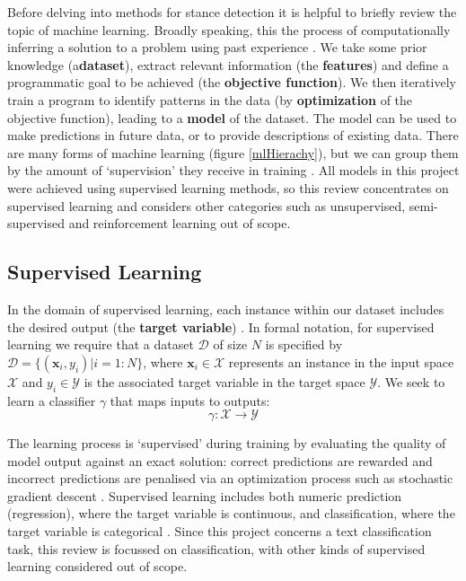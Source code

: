 \documentclass[Dissertation.tex]{subfiles}
\begin{document}
Before delving into methods for stance detection it is helpful to briefly review the topic of machine learning. Broadly speaking, this the process of computationally inferring a solution to a problem using past experience \cite{alpaydinIntroductionMachineLearning2014}. We take some prior knowledge (a\textbf{dataset}), extract relevant information (the \textbf{features}) and define a programmatic goal to be achieved (the \textbf{objective function}). We then iteratively train a program to identify patterns in the data (by \textbf{optimization} of the objective function), leading to a\textbf{ model }of the dataset. The model can be used to make predictions in future data, or to provide descriptions of existing data\cite{alpaydinIntroductionMachineLearning2014}. There are many forms of machine learning (figure \ref{mlHierachy}), but we can group them by the amount of `supervision' they receive in training \cite{geronHandsonMachineLearning2017}. All models in this project were achieved using supervised learning methods, so this review concentrates on supervised learning and considers other categories such as unsupervised, semi-supervised and reinforcement learning out of scope.

\subsection{Supervised Learning}
In the domain of supervised learning, each instance within our dataset includes the desired output (the \textbf{target variable}) \cite{geronHandsonMachineLearning2017}. In formal notation, for supervised learning we require that a dataset $ \mathcal{D}$ of size $N$ is specified by $ \mathcal{D} = \{(\mathbf{x}_i, y_i) | i = 1:N\}$, where $ \mathbf{x}_i \in \mathcal{X} $ represents an instance in the input space $ \mathcal{X} $ and $ y_i \in \mathcal{Y}$ is the associated target variable in the target space $ \mathcal{Y} $. We seek to learn a classifier $ \gamma $ that maps inputs to outputs:
$$ \gamma: \mathcal{X}\rightarrow\mathcal{Y}$$ 

The learning process is `supervised' during training by evaluating the quality of model output against an exact solution: correct predictions are rewarded and incorrect predictions are penalised via an optimization process such as stochastic gradient descent \cite{mendelsonAdvancedLecturesMachine2003}. Supervised learning includes both numeric prediction (regression), where the target variable is continuous, and classification, where the target variable is categorical \cite{wittenDataMiningPractical2011}. Since this project concerns a text classification task, this review is focussed on classification, with other kinds of supervised learning considered out of scope. 
\end{document}
